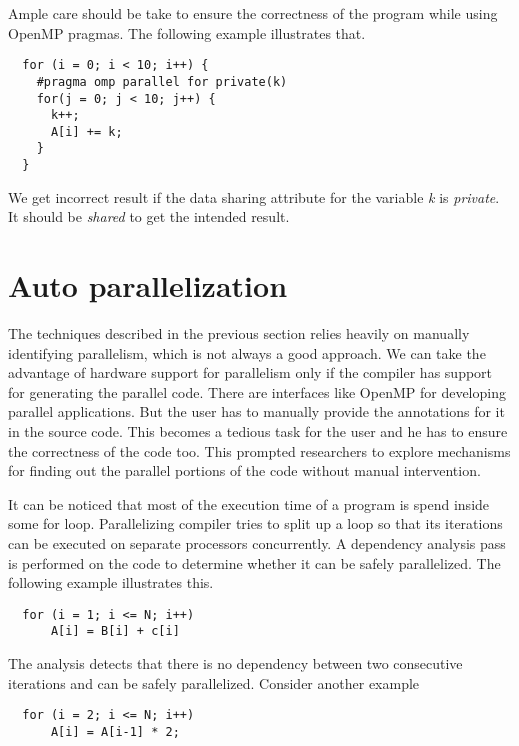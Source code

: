 Ample care should be take to ensure the correctness of the program while using OpenMP pragmas. The following
example illustrates that.
{\footnotesize
\begin{lstlisting}
  for (i = 0; i < 10; i++) {
    #pragma omp parallel for private(k)
    for(j = 0; j < 10; j++) {
      k++;
      A[i] += k;
    }
  }
\end{lstlisting}
}

We get incorrect result if the data sharing attribute for the variable \emph{k} is \emph {private}. It should
be \emph{shared} to get the intended result.



\section{Auto parallelization}
The techniques described in the previous section relies heavily on manually
identifying parallelism, which is not always a good approach.
We can take the advantage of hardware support for parallelism only if the compiler has
support for generating the parallel code. There are interfaces like OpenMP for
developing parallel applications. But the user has to manually provide the annotations
for it in the source code. This becomes a tedious task for the user and he has to
ensure the correctness of the code too. This prompted researchers to explore
mechanisms for finding out the parallel portions of the code without manual intervention.

It can be noticed that most of the execution time of a program is spend inside some
for loop. Parallelizing compiler tries to split up a loop so that its iterations can
be executed on separate processors concurrently. A dependency analysis pass is 
performed on the code to determine whether it can be safely parallelized. The following
example illustrates this.

{\footnotesize
\begin{lstlisting}
  for (i = 1; i <= N; i++)
      A[i] = B[i] + c[i]
\end{lstlisting}
}

\noindent
The analysis detects that there is no dependency between two consecutive iterations and
can be safely parallelized. Consider another example

{\footnotesize
\begin{lstlisting}
  for (i = 2; i <= N; i++)
      A[i] = A[i-1] * 2;
\end{lstlisting}
}

